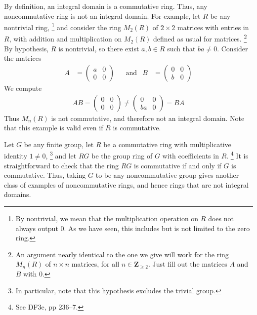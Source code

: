 \documentclass[oneside, english, 11pt]{article}
\newcommand{\integers}{\mathbf{Z}}
\begin{document}
{By definition, an integral domain is a commutative ring. Thus, any noncommutative ring is not an integral domain. For example, let $R$ be any nontrivial ring,%
\footnote{By nontrivial, we mean that the multiplication operation on $R$ does not always output $0$. As we have seen, this includes but is not limited to the zero ring.} %
and consider the ring $M_{2}(R)$ of $2 \times 2$ matrices with entries in $R$, with addition and multiplication on $M_{2}(R)$ defined as usual for matrices.%
\footnote{An argument nearly identical to the one we give will work for the ring $M_{n}(R)$ of $n \times n$ matrices, for all $n \in \integers_{\geq 2}$. Just fill out the matrices $A$ and $B$ with $0$.} %
By hypothesis, $R$ is nontrivial, so there exist $a, b \in R$ such that $b a \neq 0$. Consider the matrices
\begin{align*}
A
&=
\begin{pmatrix}
a	&	0	\\
0	&	0
\end{pmatrix}
&
&\text{and}
&
B
&=
\begin{pmatrix}
0	&	0	\\
b	&	0
\end{pmatrix}
\end{align*}
We compute
\begin{align*}
A B
=
\begin{pmatrix}
0	&	0	\\
0	&	0
\end{pmatrix}
\neq
\begin{pmatrix}
0		&	0	\\
b a	&	0
\end{pmatrix}
=
B A
\end{align*}
Thus $M_{n}(R)$ is not commutative, and therefore not an integral domain. Note that this example is valid even if $R$ is commutative.

Let $G$ be any finite group, let $R$ be a commutative ring with multiplicative identity $1 \neq 0$,%
\footnote{In particular, note that this hypothesis excludes the trivial group.} %
and let $R G$ be the group ring of $G$ with coefficients in $R$.%
\footnote{See DF3e, pp 236--7.} %
It is straightforward to check that the ring $R G$ is commutative if and only if $G$ is commutative. Thus, taking $G$ to be any noncommutative group gives another class of examples of noncommutative rings, and hence rings that are not integral domains.

}
\end{document}
